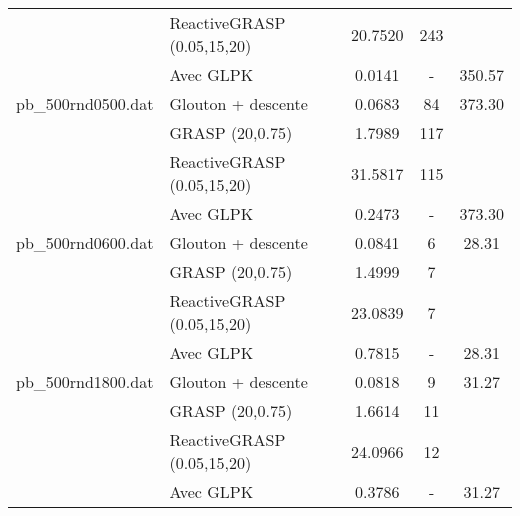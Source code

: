 \begin{minipage}
\begin{longtable}{|l|l|c|c|c|}
                   & ReactiveGRASP (0.05,15,20) & 20.7520 & 243 & \\
                   & Avec GLPK & 0.0141 & - & 350.57 \\
\hline
pb\_500rnd0500.dat & Glouton + descente & 0.0683 & 84 & 373.30 \\
                   & GRASP (20,0.75) & 1.7989 & 117 & \\
                   & ReactiveGRASP (0.05,15,20) & 31.5817 & 115 & \\
                   & Avec GLPK & 0.2473 & - & 373.30 \\
\hline
pb\_500rnd0600.dat & Glouton + descente & 0.0841 & 6 & 28.31 \\
                   & GRASP (20,0.75) & 1.4999 & 7 & \\
                   & ReactiveGRASP (0.05,15,20) & 23.0839 & 7 & \\
                   & Avec GLPK & 0.7815 & - & 28.31 \\
\hline
pb\_500rnd1800.dat & Glouton + descente & 0.0818 & 9 & 31.27 \\
                   & GRASP (20,0.75) & 1.6614 & 11 & \\
                   & ReactiveGRASP (0.05,15,20) & 24.0966 & 12 & \\
                   & Avec GLPK & 0.3786 & - & 31.27 \\
\hline
\end{longtable}


\end{minipage}
